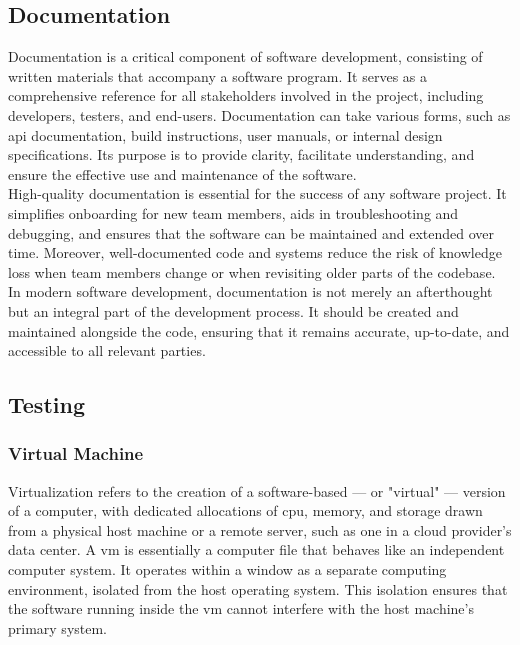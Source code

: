 \newpage

\subsection{Documentation}
\label{subsec:documentation}

Documentation is a critical component of software development, consisting of written materials that accompany a software program. It serves as a comprehensive reference for all stakeholders involved in the project, including developers, testers, and end-users. Documentation can take various forms, such as \gls{api} documentation, build instructions, user manuals, or internal design specifications. Its purpose is to provide clarity, facilitate understanding, and ensure the effective use and maintenance of the software. \cite{geeksforgeeks:doc} \\

High-quality documentation is essential for the success of any software project. It simplifies onboarding for new team members, aids in troubleshooting and debugging, and ensures that the software can be maintained and extended over time. Moreover, well-documented code and systems reduce the risk of knowledge loss when team members change or when revisiting older parts of the codebase. \cite{geeksforgeeks:doc} \\

In modern software development, documentation is not merely an afterthought but an integral part of the development process. It should be created and maintained alongside the code, ensuring that it remains accurate, up-to-date, and accessible to all relevant parties.

\subsection{Testing}
\label{subsec:testing}

\subsubsection*{Virtual Machine}
\label{subsubsec:virtual-machine}

Virtualization refers to the creation of a software-based — or "virtual" — version of a computer, with dedicated allocations of \gls{cpu}, memory, and storage drawn from a physical host machine or a remote server, such as one in a cloud provider's data center. A \gls{vm} is essentially a computer file that behaves like an independent computer system. It operates within a window as a separate computing environment, isolated from the host operating system. This isolation ensures that the software running inside the \gls{vm} cannot interfere with the host machine’s primary system. \cite{microsoft:virtual-machine}

